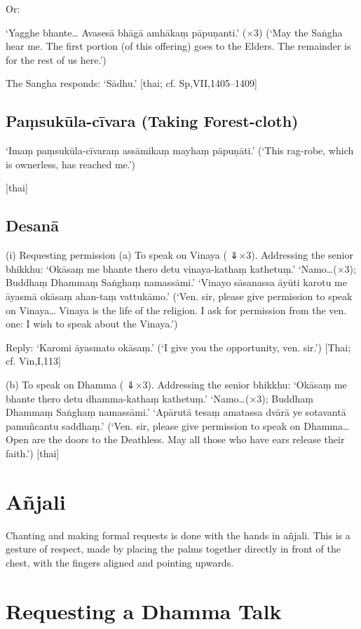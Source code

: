 Or:

‘Yagghe bhante…
Avasesā bhāgā amhākaṃ pāpuṇanti.’ (×3)
(‘May the Saṅgha hear me. The first
portion (of this offering) goes to the Elders.
The remainder is for the rest of us here.’)

The Sangha responds: ‘Sādhu.’
[thai; cf. Sp,VII,1405–1409]

\section{Paṃsukūla-cīvara (Taking Forest-cloth)}

‘Imaṃ paṃsukūla-cīvaraṃ
assāmikaṃ mayhaṃ pāpuṇāti.’
(‘This rag-robe, which is ownerless,
has reached me.’)

[thai]

\section{Desanā}

(i) Requesting permission
(a) To speak on Vinaya
( ⇓×3). Addressing the senior bhikkhu:
‘Okāsaṃ me bhante thero detu
vinaya-kathaṃ kathetuṃ.’
‘Namo…(×3);
Buddhaṃ Dhammaṃ Saṅghaṃ namassāmi.’
‘Vinayo sāsanassa āyūti karotu me āyasmā
okāsaṃ ahan-taṃ vattukāmo.’
(‘Ven. sir, please give permission to speak on
Vinaya… Vinaya is the life of the religion.
I ask for permission from the ven. one:
I wish to speak about the Vinaya.’)

Reply: ‘Karomi āyasmato okāsaṃ.’
(‘I give you the opportunity, ven. sir.’)
[Thai; cf. Vin,I,113]

(b) To speak on Dhamma
( ⇓×3). Addressing the senior bhikkhu:
‘Okāsaṃ me bhante thero detu
dhamma-kathaṃ kathetuṃ.’
‘Namo…(×3);
Buddhaṃ Dhammaṃ Saṅghaṃ namassāmi.’
‘Apārutā tesaṃ amatassa dvārā
ye sotavantā pamuñcantu saddhaṃ.’
(‘Ven. sir, please give permission to speak on
Dhamma… Open are the doors to the Deathless.
May all those who have ears release their faith.’)
[thai]

\chapter{Añjali}

Chanting and making formal requests is done with the hands in añjali.
This is a gesture of respect, made by placing the palms together
directly in front of the chest, with the fingers aligned and pointing
upwards.

\chapter{Requesting a Dhamma Talk}

